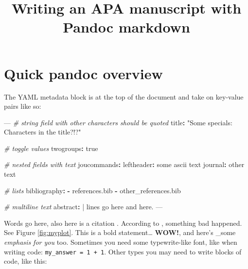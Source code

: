 \documentclass[man,longtable,noextraspace,floatsintext]{apa6}
\title{Writing an APA manuscript with Pandoc markdown}
\newenvironment{Shaded}{}{}
\newcommand{\AttributeTok}[1]{\textcolor[rgb]{0.49,0.56,0.16}{#1}}
\newcommand{\CharTok}[1]{\textcolor[rgb]{0.25,0.44,0.63}{#1}}
\newcommand{\CommentTok}[1]{\textcolor[rgb]{0.38,0.63,0.69}{\textit{#1}}}
\newcommand{\FunctionTok}[1]{\textcolor[rgb]{0.02,0.16,0.49}{#1}}
\newcommand{\KeywordTok}[1]{\textcolor[rgb]{0.00,0.44,0.13}{\textbf{#1}}}
\newcommand{\NormalTok}[1]{#1}
\newcommand{\PreprocessorTok}[1]{\textcolor[rgb]{0.74,0.48,0.00}{#1}}
\newcommand{\StringTok}[1]{\textcolor[rgb]{0.25,0.44,0.63}{#1}}
\begin{document}
\maketitle

\hypertarget{quick-pandoc-overview}{%
\section{Quick pandoc overview}\label{quick-pandoc-overview}}

The YAML metadata block is at the top of the document and take on
key-value pairs like so:

\begin{Shaded}
\begin{Highlighting}[]
\PreprocessorTok{---}
\CommentTok{# string field with other characters should be quoted}
\FunctionTok{title}\KeywordTok{:}\AttributeTok{ }\StringTok{"Some specials: Characters in the title?!?"}

\CommentTok{# toggle values}
\FunctionTok{twogroups}\KeywordTok{:}\AttributeTok{ }\CharTok{true}

\CommentTok{# nested fields with text}
\FunctionTok{joucommands}\KeywordTok{:}
\AttributeTok{    }\FunctionTok{leftheader}\KeywordTok{:}\AttributeTok{ some ascii text}
\AttributeTok{    }\FunctionTok{journal}\KeywordTok{:}\AttributeTok{ other text}

\CommentTok{# lists}
\FunctionTok{bibliography}\KeywordTok{:}
\AttributeTok{    }\KeywordTok{-}\AttributeTok{ references.bib}
\AttributeTok{    }\KeywordTok{-}\AttributeTok{ other_references.bib}

\CommentTok{# multiline text}
\FunctionTok{abstract}\KeywordTok{: }\CharTok{|}
\NormalTok{    lines go here}
\NormalTok{    and here.}
\PreprocessorTok{---}
\end{Highlighting}
\end{Shaded}

Words go here, also here is a citation \autocite{someArticle}. According
to \textcite{anotherArticle}, something bad happened. See Figure
\ref{fig:myplot}. This is a bold statement\ldots{} \textbf{WOW!}, and
here's \_some \emph{emphasis for you} too. Sometimes you need some
typewrite-like font, like when writing code:
\texttt{my\_answer\ =\ 1\ +\ 1}. Other types you may need to write
blocks of code, like this:
\end{document}
